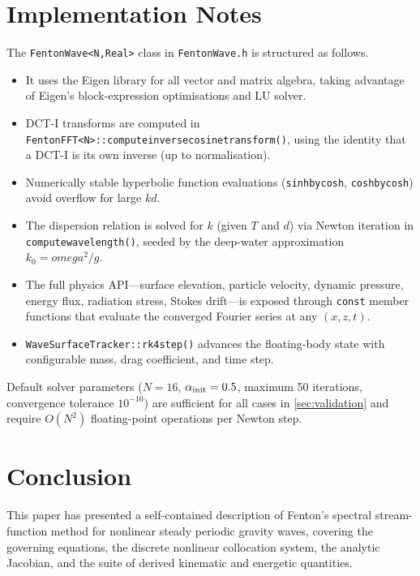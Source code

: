 \documentclass[journal,10pt,twocolumn]{IEEEtran}
\def\omega{omega}%
\def\_{}%
\begin{document}
\section{Implementation Notes}
\label{sec:implementation}

The \texttt{FentonWave<N,Real>} class in \texttt{FentonWave.h} is
structured as follows.
\begin{itemize}[leftmargin=1.4em]
    \item It uses the Eigen library for all vector and matrix algebra,
          taking advantage of Eigen's block-expression optimisations
          and LU solver.
    \item DCT-I transforms are computed in
          \texttt{FentonFFT<N>::compute\_inverse\_cosine\_transform()},
          using the identity that a DCT-I is its own inverse (up to
          normalisation).
    \item Numerically stable hyperbolic function evaluations
          (\texttt{sinh\_by\_cosh}, \texttt{cosh\_by\_cosh}) avoid
          overflow for large $kd$.
    \item The dispersion relation is solved for $k$ (given $T$ and $d$)
          via Newton iteration in \texttt{compute\_wavelength()},
          seeded by the deep-water approximation $k_0 = \omega^2/g$.
    \item The full physics API---surface elevation, particle velocity,
          dynamic pressure, energy flux, radiation stress, Stokes
          drift---is exposed through \texttt{const} member functions
          that evaluate the converged Fourier series at any $(x,z,t)$.
    \item \texttt{WaveSurfaceTracker::rk4\_step()} advances the
          floating-body state with configurable mass, drag coefficient,
          and time step.
\end{itemize}
Default solver parameters ($N=16$, $\alpha_{\rm init}=0.5$,
maximum 50 iterations, convergence tolerance $10^{-10}$) are
sufficient for all cases in \cref{sec:validation} and require
$O(N^2)$ floating-point operations per Newton step.

\section{Conclusion}
\label{sec:conclusion}

This paper has presented a self-contained description of Fenton's
spectral stream-function method for nonlinear steady periodic gravity
waves, covering the governing equations, the discrete nonlinear
collocation system, the analytic Jacobian, and the suite of derived
kinematic and energetic quantities.
\end{document}
